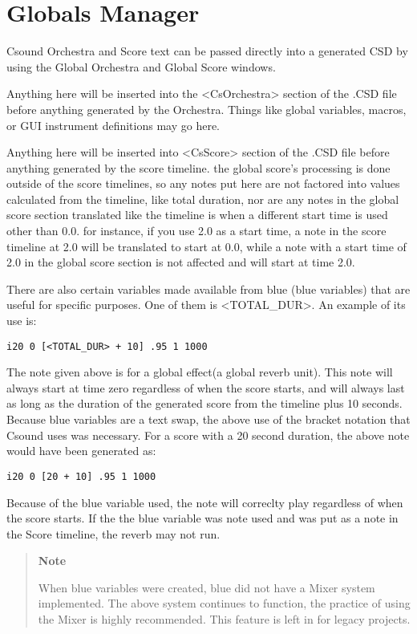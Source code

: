 \section{Globals Manager}\label{globalsManager}

Csound Orchestra and Score text can be passed directly into a generated
CSD by using the Global Orchestra and Global Score windows.

Anything here will be inserted into the
\textless{}CsOrchestra\textgreater{} section of the .CSD file before
anything generated by the Orchestra. Things like global variables,
macros, or GUI instrument definitions may go here.

Anything here will be inserted into \textless{}CsScore\textgreater{}
section of the .CSD file before anything generated by the score
timeline. the global score's processing is done outside of the score
timelines, so any notes put here are not factored into values calculated
from the timeline, like total duration, nor are any notes in the global
score section translated like the timeline is when a different start
time is used other than 0.0. for instance, if you use 2.0 as a start
time, a note in the score timeline at 2.0 will be translated to start at
0.0, while a note with a start time of 2.0 in the global score section
is not affected and will start at time 2.0.

There are also certain variables made available from blue (blue
variables) that are useful for specific purposes. One of them is
\textless{}TOTAL\_DUR\textgreater{}. An example of its use is:

\begin{verbatim}
i20 0 [<TOTAL_DUR> + 10] .95 1 1000
\end{verbatim}

The note given above is for a global effect(a global reverb unit). This
note will always start at time zero regardless of when the score starts,
and will always last as long as the duration of the generated score from
the timeline plus 10 seconds. Because blue variables are a text swap,
the above use of the bracket notation that Csound uses was necessary.
For a score with a 20 second duration, the above note would have been
generated as:

\begin{verbatim}
i20 0 [20 + 10] .95 1 1000
\end{verbatim}

Because of the blue variable used, the note will correclty play
regardless of when the score starts. If the the blue variable was note
used and was put as a note in the Score timeline, the reverb may not
run.

\begin{quote}
\textbf{Note}

When blue variables were created, blue did not have a Mixer system
implemented. The above system continues to function, the practice of
using the Mixer is highly recommended. This feature is left in for
legacy projects.
\end{quote}
